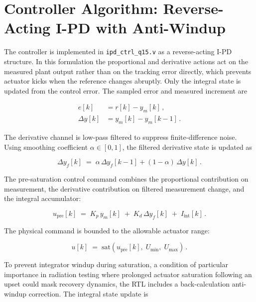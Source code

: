 \section{Controller Algorithm: Reverse-Acting I-PD with Anti-Windup}
\label{sec:bench_controller}

The controller is implemented in \texttt{ipd\_ctrl\_q15.v} as a
reverse-acting I-PD structure.  In this formulation the proportional
and derivative actions act on the measured plant output rather than on
the tracking error directly, which prevents actuator kicks when the
reference changes abruptly.  Only the integral state is updated from
the control error.  The sampled error and measured increment are

\begin{align}
  e[k]       &= r[k] - y_m[k] \,, \label{eq:error} \\
  \Delta y[k] &= y_m[k] - y_m[k-1] \,. \label{eq:dy}
\end{align}

The derivative channel is low-pass filtered to suppress
finite-difference noise.  Using smoothing coefficient
$\alpha \in [0,1]$, the filtered derivative state is updated as

\begin{equation}
  \Delta y_f[k] \;=\; \alpha\,\Delta y_f[k-1]
    + (1-\alpha)\,\Delta y[k] \,.
  \label{eq:dy_filter}
\end{equation}

The pre-saturation control command combines the proportional contribution
on measurement, the derivative contribution on filtered measurement
change, and the integral accumulator:

\begin{equation}
  u_{\mathrm{pre}}[k] \;=\;
    K_p\,y_m[k] \;+\; K_d\,\Delta y_f[k] \;+\; I_{\mathrm{int}}[k] \,.
  \label{eq:u_pre}
\end{equation}

The physical command is bounded to the allowable actuator range:

\begin{equation}
  u[k] \;=\; \mathrm{sat}\!\left(u_{\mathrm{pre}}[k],\;
    U_{\min},\; U_{\max}\right) \,.
  \label{eq:u_sat}
\end{equation}

To prevent integrator windup during saturation, a condition of
particular importance in radiation testing where prolonged actuator
saturation following an upset could mask recovery dynamics, the RTL
includes a back-calculation anti-windup correction.  The integral state
update is

